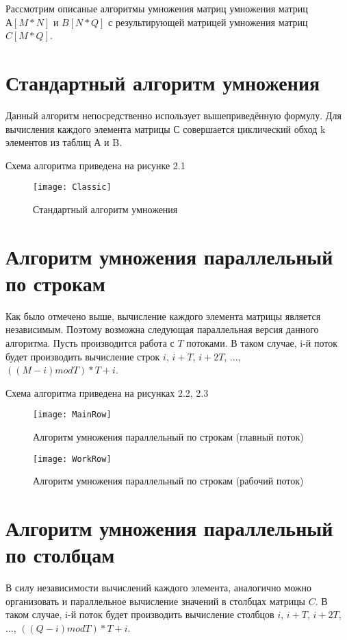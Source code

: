 Рассмотрим описаные алгоритмы умножения матриц умножения матриц $ А[M*N] $ и $ B[N*Q] $ с результирующей матрицей умножения матриц $ C[M*Q] $.

\section{Стандартный алгоритм умножения}
Данный алгоритм непосредственно использует вышеприведённую формулу. Для вычисления каждого элемента матрицы С совершается циклический обход k элементов из таблиц А и B.

Схема алгоритма приведена на рисунке 2.1
\begin{figure}[h]
	\begin{center}
		{\texttt{[image: Classic]}}
		\caption{Стандартный алгоритм умножения}
	\end{center}
\end{figure}


\section{Алгоритм умножения параллельный по строкам}
Как было отмечено выше, вычисление каждого элемента матрицы является независимым. Поэтому возможна следующая параллельная версия данного алгоритма. Пусть производится работа с $T$ потоками. В таком случае, i-й поток будет производить вычисление строк $i$, $i+T$, $i+2T$, ..., $((M-i) mod T)*T + i$.

Схема алгоритма приведена на рисунках 2.2, 2.3
\begin{figure}[h]
	\begin{center}
		{\texttt{[image: MainRow]}}
		\caption{Алгоритм умножения параллельный по строкам (главный поток)}
	\end{center}
\end{figure}
\begin{figure}[h]
	\begin{center}
		{\texttt{[image: WorkRow]}}
		\caption{Алгоритм умножения параллельный по строкам (рабочий поток)}
	\end{center}
\end{figure}


\section{Алгоритм умножения параллельный по столбцам}
В силу независимости вычислений каждого элемента, аналогично можно организовать и параллельное вычисление значений в столбцах матрицы $C$. В таком случае, i-й поток будет производить вычисление столбцов $i$, $i+T$, $i+2T$, ..., $((Q-i) mod T)*T + i$.

